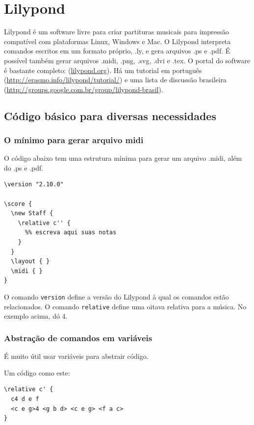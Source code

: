 \documentclass[12pt,brazil]{book}
\begin{document}
\chapter{Lilypond}
\label{sec:lilypond}

Lilypond é um software livre para criar partituras musicais para
impressão compatível com plataformas Linux, Windows e Mac. O Lilypond
interpreta comandos escritos em um formato próprio, .ly, e gera
arquivos .ps e .pdf. É possível também gerar arquivos .midi, .png,
.svg, .dvi e .tex. O portal do software é bastante completo:
(\url{lilypond.org}). Há um tutorial em português
(\url{http://erasmo.info/lilypond/tutorial/}) e uma lista de discussão
brasileira (\url{http://groups.google.com.br/group/lilypond-brasil}).


\section{Código básico para diversas necessidades}
\label{sec:codigo-basico-para}

\subsection{O mínimo para gerar arquivo midi}
\label{sec:o-minimo-para}

O código abaixo tem uma estrutura mínima para gerar um arquivo .midi,
além do .ps e .pdf.

\begin{verbatim}
\version "2.10.0"

\score {
  \new Staff {
    \relative c'' {
      %% escreva aqui suas notas
    }
  }
  \layout { }
  \midi { }
}
\end{verbatim}

O comando \texttt{version} define a versão do Lilypond à qual os
comandos estão relacionados. O comando \texttt{relative} define uma
oitava relativa para a música. No exemplo acima, dó 4.

\subsection{Abstração de comandos em variáveis}
\label{sec:abstr-de-comand}

É muito útil usar variáveis para abstrair código.

Um código como este:

\begin{verbatim}
\relative c' {
  c4 d e f
  <c e g>4 <g b d> <c e g> <f a c>
}
\end{verbatim}
\end{document}
